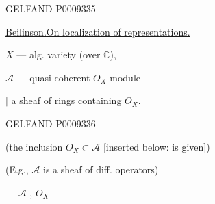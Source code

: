 \begin{GelfandAdjacentEvidence}{GELFAND-P000933}{5}


\underline{\underline{Beilinson.}}\qquad\underline{On localization of representations.}

$X$ --- alg. variety (over $\mathbb C$),

$\mathcal A$ --- quasi-coherent $O_X$-module

\hspace{2em}\(\vert\) a sheaf of rings containing $O_X$.
\end{GelfandAdjacentEvidence}
\begin{GelfandAdjacentEvidence}{GELFAND-P000933}{6}


(the inclusion $O_X\subset\mathcal A$ [inserted below: is given])
\end{GelfandAdjacentEvidence}


(E.g., $\mathcal A$ is a sheaf of diff. operators)

 ---  $\mathcal A$-,
 $O_X$-

